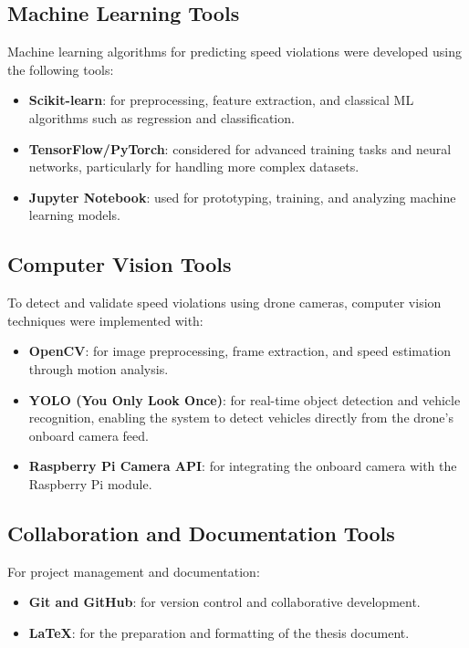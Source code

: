 \subsection*{Machine Learning Tools}
Machine learning algorithms for predicting speed violations were developed 
using the following tools:  
\begin{itemize}
    \item \textbf{Scikit-learn}: for preprocessing, feature extraction, and classical ML algorithms 
    such as regression and classification.  
    \item \textbf{TensorFlow/PyTorch}: considered for advanced training tasks and 
    neural networks, particularly for handling more complex datasets.  
    \item \textbf{Jupyter Notebook}: used for prototyping, training, and analyzing 
    machine learning models.  
\end{itemize}

\subsection*{Computer Vision Tools}
To detect and validate speed violations using drone cameras, computer vision 
techniques were implemented with:  
\begin{itemize}
    \item \textbf{OpenCV}: for image preprocessing, frame extraction, and speed estimation 
    through motion analysis.  
    \item \textbf{YOLO (You Only Look Once)}: for real-time object detection and vehicle recognition, 
    enabling the system to detect vehicles directly from the drone’s onboard camera feed.  
    \item \textbf{Raspberry Pi Camera API}: for integrating the onboard camera with the 
    Raspberry Pi module.  
\end{itemize}

\subsection*{Collaboration and Documentation Tools}
For project management and documentation:  
\begin{itemize}
    \item \textbf{Git and GitHub}: for version control and collaborative development.  
    \item \textbf{LaTeX}: for the preparation and formatting of the thesis document.  
\end{itemize}




